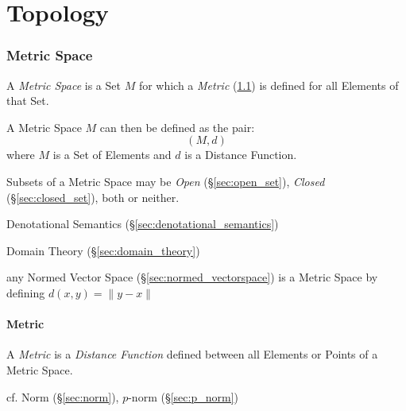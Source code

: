 \part{Topology}\label{part:topology}\cite{lc11}

\section{Metric Space}\label{sec:metric_space}

A \emph{Metric Space} is a Set $M$ for which a \emph{Metric}
(\ref{sec:metric}) is defined for all Elements of that Set.

A Metric Space $M$ can then be defined as the pair:
\[
  (M,d)
\]
where $M$ is a Set of Elements and $d$ is a Distance Function.

Subsets of a Metric Space may be \emph{Open}
(\S\ref{sec:open_set}), \emph{Closed} (\S\ref{sec:closed_set}),
both or neither.

Denotational Semantics (\S\ref{sec:denotational_semantics})

Domain Theory (\S\ref{sec:domain_theory})

any Normed Vector Space (\S\ref{sec:normed_vectorspace}) is a Metric Space by
defining $d(x,y) = \|y-x\|$



\subsection{Metric}\label{sec:metric}

A \emph{Metric} is a \emph{Distance Function} defined between all
Elements or Points of a Metric Space.

cf. Norm (\S\ref{sec:norm}), $p$-norm (\S\ref{sec:p_norm})

